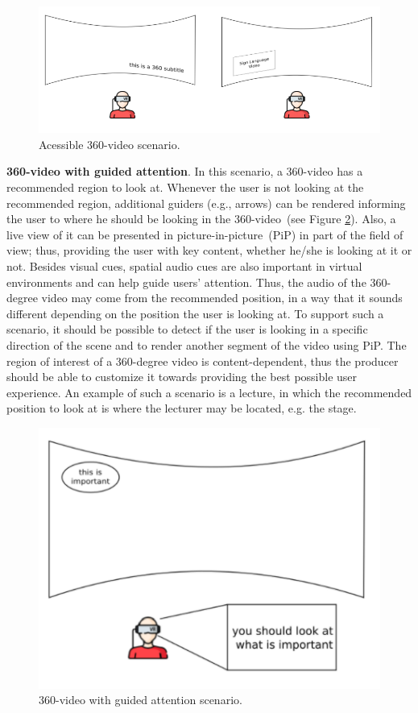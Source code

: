 \begin{figure}[!ht]
    \centering
    \includegraphics[width=0.65\linewidth]{img/video360/accessible.png}
    \caption{Acessible 360-video scenario.}
    \label{fig:cenario_acessivel}
\end{figure}

\textbf{360-video with guided attention}.
In this scenario, a 360-video has a recommended region to look at. Whenever the user is not looking at the recommended region, additional guiders (e.g., arrows) can be rendered informing the user to where he should be looking in the 360-video~(see Figure \ref{fig:cenario_guiado}). Also, a live view of it can be presented in picture-in-picture~(PiP) in part of the field of view; thus, providing the user with key content, whether he/she is looking at it or not. Besides visual cues, spatial audio cues are also important in virtual environments and can help guide users' attention. Thus, the audio of the 360-degree video may come from the recommended position, in a way that it sounds different depending on the position the user is looking at. To support such a scenario, it should be possible to detect if the user is looking in a specific direction of the scene and to render another segment of the video using PiP. The region of interest of a 360-degree video is content-dependent, thus the producer should be able to customize it towards providing the best possible user experience. An example of such a scenario is a lecture, in which the recommended position to look at is where the lecturer may be located, e.g. the stage.

\begin{figure}[!ht]
    \centering
    \includegraphics[width=0.5\linewidth]{img/video360/guided.png}
    \caption{360-video with guided attention scenario.}
    \label{fig:cenario_guiado}
\end{figure}


